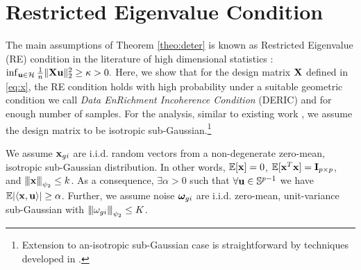 \section{Restricted Eigenvalue Condition}
\label{sec:re}
The main assumptions of Theorem \ref{theo:deter} is known as Restricted Eigenvalue (RE) condition in the literature of high dimensional statistics \cite{banerjee14, nrwy12, raskutti10}:
$\inf_{\mathbf{u} \in {\cal H}} \frac{1}{n} \|\mathbf{X} \mathbf{u}\|_{2}^2 \geq \kappa > 0.$
Here, we show that for the design matrix $\mathbf{X}$ defined in \eqref{eq:x}, the RE condition holds with high probability under a suitable geometric condition we call {\em Data EnRichment Incoherence Condition} (DERIC) and for enough number of samples.
For the analysis, similar to existing work \cite{trop15, mend15, guba16}, we assume the design matrix to be isotropic sub-Gaussian.\footnote{Extension to an-isotropic sub-Gaussian case is straightforward by techniques developed in \cite{banerjee14, ruzh13}.}
\begin{definition}
	\label{def:obs}
	We assume $\mathbf{x}_{gi}$ are i.i.d. random vectors from a non-degenerate zero-mean, isotropic sub-Gaussian distribution. In other words, $\mathbb{E} [\mathbf{x}] = 0$, $\mathbb{E} [\mathbf{x}^T \mathbf{x}] = \mathbf{I}_{p \times p}$, and ${\left\vert\kern-0.25ex\left\vert\kern-0.25ex\left\vert \mathbf{x} \right\vert\kern-0.25ex\right\vert\kern-0.25ex\right\vert}_{\psi_2} \leq k$.	
As a consequence, $\exists \alpha > 0$ such that $\forall \mathbf{u} \in \mathbb S^{p-1}$ we have $ \mathbb{E}|\langle \mathbf{x}, \mathbf{u} \rangle| \geq \alpha$. Further, we assume noise $\boldsymbol{\omega}_{gi} $ are i.i.d.
zero-mean, unit-variance sub-Gaussian with ${\left\vert\kern-0.25ex\left\vert\kern-0.25ex\left\vert \omega_{gi} \right\vert\kern-0.25ex\right\vert\kern-0.25ex\right\vert}_{\psi_2} \leq K$.
\end{definition}


